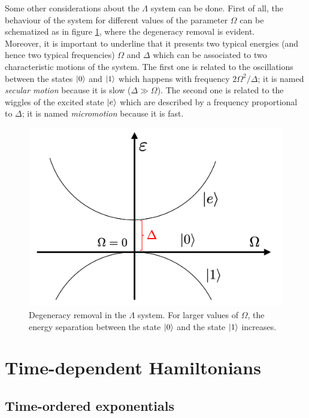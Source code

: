 Some other considerations about the $\Lambda$ system can be done. First of all, the behaviour of the system for different values of the parameter $\Omega$ can be schematized as in figure \ref{fig:deg_rem}, where the degeneracy removal is evident. \\
Moreover, it is important to underline that it presents two typical energies (and hence two typical frequencies) $\Omega$ and $\Delta$ which can be associated to two characteristic motions of the system. The first one is related to the oscillations between the states $\ket{0}$ and $\ket{1}$ which happens with frequency $2 \Omega^2/\Delta$; it is named \textit{secular motion} because it is slow ($\Delta \gg \Omega$). The second one is related to the wiggles of the excited state $\ket{e}$ which are described by a frequency proportional to $\Delta$; it is named \textit{micromotion} because it is fast. 

\begin{figure}[t!]
\centering
\includegraphics[width=0.61\linewidth]{images/Degeneracy_removal.png}
    \caption{Degeneracy removal in the $\Lambda$ system. For larger values of $\Omega$, the energy separation between the state $\ket{0}$ and the state $\ket{1}$ increases.}
    \label{fig:deg_rem}
\end{figure}

\section{Time-dependent Hamiltonians}
\label{sec:time_dep_sys}

\subsection{Time-ordered exponentials}

